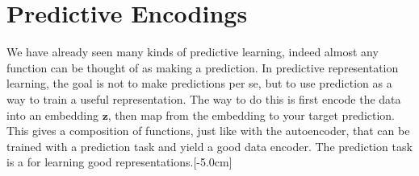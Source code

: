 
\section{Predictive Encodings}

We have already seen many kinds of predictive learning, indeed almost any function can be thought of as making a prediction. In predictive representation learning, the goal is not to make predictions per se, but to use prediction as a way to train a useful representation. The way to do this is first encode the data into an embedding $\mathbf{z}$, then map from the embedding to your target prediction. This gives a composition of functions, just like with the autoencoder, that can be trained with a prediction task and yield a good data encoder. The prediction task is a  for learning good representations.[-5.0cm]

